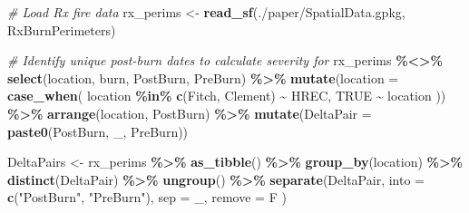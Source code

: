 \documentclass[
]{article}
\newenvironment{Shaded}{\begin{snugshade}}{\end{snugshade}}
\newcommand{\AttributeTok}[1]{\textcolor[rgb]{0.13,0.29,0.53}{#1}}
\newcommand{\CommentTok}[1]{\textcolor[rgb]{0.56,0.35,0.01}{\textit{#1}}}
\newcommand{\ConstantTok}[1]{\textcolor[rgb]{0.56,0.35,0.01}{#1}}
\newcommand{\FunctionTok}[1]{\textcolor[rgb]{0.13,0.29,0.53}{\textbf{#1}}}
\newcommand{\NormalTok}[1]{#1}
\newcommand{\OtherTok}[1]{\textcolor[rgb]{0.56,0.35,0.01}{#1}}
\newcommand{\SpecialCharTok}[1]{\textcolor[rgb]{0.81,0.36,0.00}{\textbf{#1}}}
\newcommand{\StringTok}[1]{\textcolor[rgb]{0.31,0.60,0.02}{#1}}
\begin{document}
\begin{Shaded}
\begin{Highlighting}[]
\CommentTok{\# Load Rx fire data}
\NormalTok{  rx\_perims }\OtherTok{\textless{}{-}} \FunctionTok{read\_sf}\NormalTok{(}\StringTok{\textquotesingle{}./paper/SpatialData.gpkg\textquotesingle{}}\NormalTok{, }\StringTok{\textquotesingle{}RxBurnPerimeters\textquotesingle{}}\NormalTok{)}

\CommentTok{\# Identify unique post{-}burn dates to calculate severity for }
\NormalTok{  rx\_perims }\SpecialCharTok{\%\textless{}\textgreater{}\%}
    \FunctionTok{select}\NormalTok{(location, burn, PostBurn, PreBurn) }\SpecialCharTok{\%\textgreater{}\%}
    \FunctionTok{mutate}\NormalTok{(}\AttributeTok{location =} \FunctionTok{case\_when}\NormalTok{(}
\NormalTok{                        location }\SpecialCharTok{\%in\%} \FunctionTok{c}\NormalTok{(}\StringTok{\textquotesingle{}Fitch\textquotesingle{}}\NormalTok{, }\StringTok{\textquotesingle{}Clement\textquotesingle{}}\NormalTok{) }\SpecialCharTok{\textasciitilde{}} \StringTok{\textquotesingle{}HREC\textquotesingle{}}\NormalTok{, }
                        \ConstantTok{TRUE} \SpecialCharTok{\textasciitilde{}}\NormalTok{ location}
\NormalTok{                      )) }\SpecialCharTok{\%\textgreater{}\%}
    \FunctionTok{arrange}\NormalTok{(location, PostBurn) }\SpecialCharTok{\%\textgreater{}\%}
    \FunctionTok{mutate}\NormalTok{(}\AttributeTok{DeltaPair =} \FunctionTok{paste0}\NormalTok{(PostBurn, }\StringTok{\textquotesingle{}\_\textquotesingle{}}\NormalTok{, PreBurn)) }
  
\NormalTok{  DeltaPairs }\OtherTok{\textless{}{-}} 
\NormalTok{    rx\_perims }\SpecialCharTok{\%\textgreater{}\%}
        \FunctionTok{as\_tibble}\NormalTok{() }\SpecialCharTok{\%\textgreater{}\%}
      \FunctionTok{group\_by}\NormalTok{(location) }\SpecialCharTok{\%\textgreater{}\%}
      \FunctionTok{distinct}\NormalTok{(DeltaPair) }\SpecialCharTok{\%\textgreater{}\%}
        \FunctionTok{ungroup}\NormalTok{() }\SpecialCharTok{\%\textgreater{}\%}
      \FunctionTok{separate}\NormalTok{(DeltaPair, }\AttributeTok{into =} \FunctionTok{c}\NormalTok{(}\StringTok{"PostBurn"}\NormalTok{, }\StringTok{"PreBurn"}\NormalTok{), }\AttributeTok{sep =} \StringTok{\textquotesingle{}\_\textquotesingle{}}\NormalTok{, }\AttributeTok{remove =}\NormalTok{ F )}


\end{Highlighting}
\end{Shaded}
\end{document}
